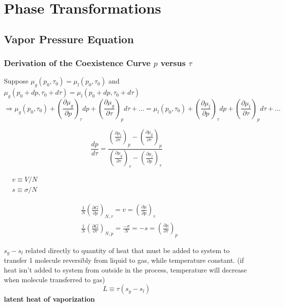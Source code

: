 \documentclass[twoside]{amsart}
\theoremstyle{plain}
\theoremstyle{definition}
\begin{document}
\section{Phase Transformations}

\subsection*{Vapor Pressure Equation}

\subsubsection*{Derivation of the Coexistence Curve $p$ versus $\tau$}

Suppose $\mu_g(p_0,\tau_0) = \mu_l(p_0,\tau_0)$ and $\mu_g(p_0 + dp, \tau_0 + d\tau) = \mu_l(p_0 + dp, \tau_0 + d\tau)$
\[
\Longrightarrow \mu_g(p_0,\tau_0) + \left( \frac{ \partial \mu_g }{ \partial p} \right)_{\tau} dp + \left( \frac{ \partial \mu_g }{ \partial \tau} \right)_{p} d\tau + \dots = \mu_l(p_0,\tau_0) + \left( \frac{ \partial \mu_l }{ \partial p} \right)_{\tau} dp + \left( \frac{ \partial \mu_l }{ \partial \tau} \right)_{p} d\tau + \dots
\]

\[
\frac{dp}{d\tau} = \frac{ \left( \frac{ \partial \mu_l }{ \partial \tau} \right)_p - \left( \frac{ \partial \mu_g }{ \partial \tau} \right)_p }{ \left( \frac{ \partial \mu_g }{ \partial \tau} \right)_{\tau} - \left( \frac{ \partial \mu_l }{ \partial p} \right)_{\tau} }
\]




$\begin{aligned}
  & v \equiv V/N \\ 
  & s \equiv \sigma /N
\end{aligned}$

\[
\begin{aligned}
  & \frac{1}{N} \left( \frac{ \partial G}{ \partial p } \right)_{N,\tau} = v = \left( \frac{ \partial \mu }{ \partial p } \right)_{\tau} \\ 
  & \frac{1}{N} \left( \frac{ \partial G}{ \partial \tau} \right)_{N,p} = \frac{-\sigma}{N} = -s = \left( \frac{ \partial \mu }{ \partial \tau} \right)_p
\end{aligned}
\]


$s_g-s_l$ related directly to quantity of heat that must be added to system to transfer 1 molecule reversibly from liquid to gas, while temperature constant.  (if heat isn't added to system from outside in the process, temperature will decrease when molecule transferred to gas)
\begin{equation}
  L \equiv \tau(s_g - s_l)
\end{equation}
\textbf{latent heat of vaporization}
\end{document}
